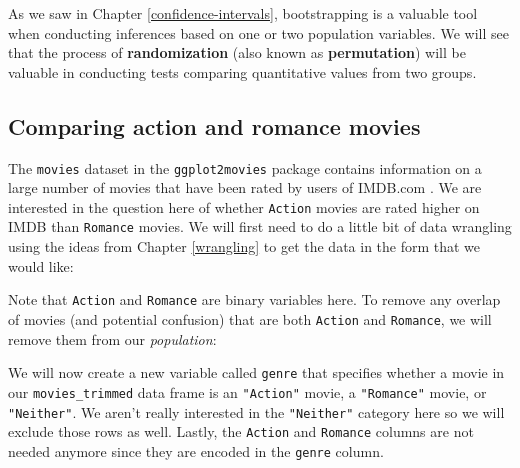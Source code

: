 \documentclass[12pt,]{krantz}
\makeatletter
\newenvironment{Shaded}{\begin{snugshade}}{\end{snugshade}}
\newcommand{\KeywordTok}[1]{\textcolor[rgb]{0.27,0.27,0.27}{\textbf{#1}}}
\newcommand{\DecValTok}[1]{\textcolor[rgb]{0.06,0.06,0.06}{#1}}
\newcommand{\StringTok}[1]{\textcolor[rgb]{0.5,0.5,0.5}{#1}}
\newcommand{\OperatorTok}[1]{\textcolor[rgb]{0.43,0.43,0.43}{\textbf{#1}}}
\newcommand{\NormalTok}[1]{#1}
\newenvironment{kframe}{%
\medskip{}
\setlength{\fboxsep}{.8em}
 \def\at@end@of@kframe{}%
 \ifinner\ifhmode%
  \def\at@end@of@kframe{\end{minipage}}%
  \begin{minipage}{\columnwidth}%
 \fi\fi%
 \def\FrameCommand##1{\hskip\@totalleftmargin \hskip-\fboxsep
 \colorbox{shadecolor}{##1}\hskip-\fboxsep
     \hskip-\linewidth \hskip-\@totalleftmargin \hskip\columnwidth}%
 \MakeFramed {\advance\hsize-\width
   \@totalleftmargin\z@ \linewidth\hsize
   \@setminipage}}%
 {\par\unskip\endMakeFramed%
 \at@end@of@kframe}
\renewenvironment{Shaded}{\begin{kframe}}{\end{kframe}}
\makeatother
\begin{document}
As we saw in Chapter \ref{confidence-intervals}, bootstrapping is a
valuable tool when conducting inferences based on one or two population
variables. We will see that the process of \textbf{randomization} (also
known as \textbf{permutation}) will be valuable in conducting tests
comparing quantitative values from two groups.

\subsection{Comparing action and romance
movies}\label{comparing-action-and-romance-movies}

The \texttt{movies} dataset in the \texttt{ggplot2movies} package
contains information on a large number of movies that have been rated by
users of IMDB.com \citep{R-ggplot2movies}. We are interested in the
question here of whether \texttt{Action} movies are rated higher on IMDB
than \texttt{Romance} movies. We will first need to do a little bit of
data wrangling using the ideas from Chapter \ref{wrangling} to get the
data in the form that we would like:

\begin{Shaded}
\end{Shaded}

Note that \texttt{Action} and \texttt{Romance} are binary variables
here. To remove any overlap of movies (and potential confusion) that are
both \texttt{Action} and \texttt{Romance}, we will remove them from our
\emph{population}:

\begin{Shaded}
\end{Shaded}

We will now create a new variable called \texttt{genre} that specifies
whether a movie in our \texttt{movies\_trimmed} data frame is an
\texttt{"Action"} movie, a \texttt{"Romance"} movie, or
\texttt{"Neither"}. We aren't really interested in the
\texttt{"Neither"} category here so we will exclude those rows as well.
Lastly, the \texttt{Action} and \texttt{Romance} columns are not needed
anymore since they are encoded in the \texttt{genre} column.
\end{document}
